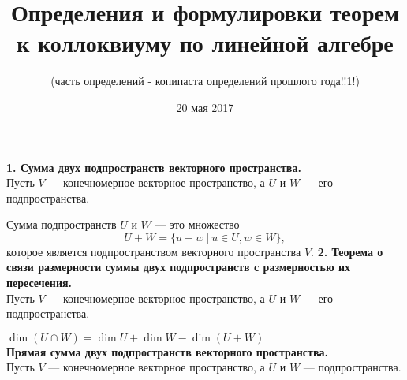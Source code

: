 \documentclass{article}
\title{Определения и формулировки теорем к коллоквиуму по линейной алгебре}
\author{(часть определений - копипаста определений прошлого года!!1!)}
\date{20 мая 2017}
\begin{document}
             
\maketitle
\noindent \textbf{1. Сумма двух подпространств векторного пространства.}\\

Пусть $V$ --- конечномерное векторное пространство, а $U$ и $W$ --- его подпространства.

Сумма подпространств $U$ и $W$ --- это множество
\[
U+W = \{u + w\ |\ u \in U, w \in W\},
\]
которое является подпространством векторного пространства $V$.
\newline
\newline
\textbf{2. Теорема о связи размерности суммы двух подпространств с размерностью их пересечения.}\\
Пусть $V$ --- конечномерное векторное пространство, а $U$ и $W$ --- его подпространства.

$\dim \left(U \cap W\right) = \dim U + \dim W - \dim \left(U+W\right)$
\\
\textbf{Прямая сумма двух подпространств векторного пространства.}\\
Пусть $V$ --- конечномерное векторное пространство, а $U$ и $W$ --- подпространства.
\end{document}
